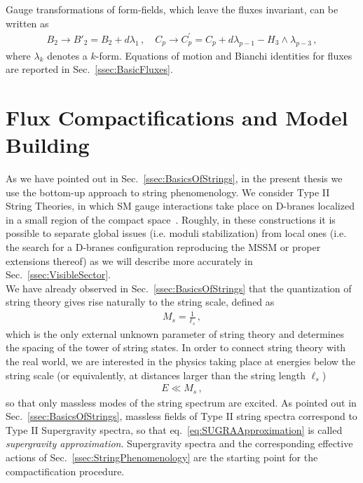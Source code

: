 \documentclass[12pt,a4paper]{book}
\begin{document}
Gauge transformations of form-fields, which leave the fluxes invariant, can be written as
\begin{align}
\label{eq:GaugeTransformations}
B_2 \rightarrow B'_2 = B_2 + d \lambda_1 \,, \quad C_p \rightarrow C^{'}_p = C_p + d \lambda_{p-1} - H_3 \wedge \lambda_{p-3} \,,
\end{align}
where $\lambda_k$ denotes a $k$-form. Equations of motion and Bianchi identities for fluxes are reported in Sec.~\ref{ssec:BasicFluxes}.


\chapter{Flux Compactifications and Model Building}
\label{chap:Compactifications&ModelBuilding}

As we have pointed out in Sec.~\ref{ssec:BasicsOfStrings}, in the present thesis we use the bottom-up approach to string phenomenology. We consider Type II String Theories, in which SM gauge interactions take place on D-branes localized in a small region of the compact space~\cite{Ibanez:2012zz, Aldazabal:2000sa}. Roughly, in these constructions it is possible to separate global issues (i.e. moduli stabilization) from local ones (i.e. the search for a D-branes configuration reproducing the MSSM or proper extensions thereof) as we will describe more accurately in Sec.~\ref{ssec:VisibleSector}.\\

We have already observed in Sec.~\ref{ssec:BasicsOfStrings} that the quantization of string theory gives rise naturally to the string scale, defined as
\begin{align}
M_s = \frac{1}{\ell_s} \,,
\end{align}
which is the only external unknown parameter of string theory and determines the spacing of the tower of string states. In order to connect string theory with the real world, we are interested in the physics taking place at energies below the string scale (or equivalently, at distances larger than the string length $\ell_s$)
\begin{align}
\label{eq:SUGRAApproximation}
E \ll M_s\,,
\end{align}
so that only massless modes of the string spectrum are excited. As pointed out in Sec.~\ref{ssec:BasicsOfStrings}, massless fields of Type II string spectra correspond to Type II Supergravity spectra, so that eq.~\eqref{eq:SUGRAApproximation} is called \textit{supergravity approximation}. Supergravity spectra and the corresponding effective actions of Sec.~\ref{ssec:StringPhenomenology} are the starting point for the compactification procedure.\\
\end{document}
